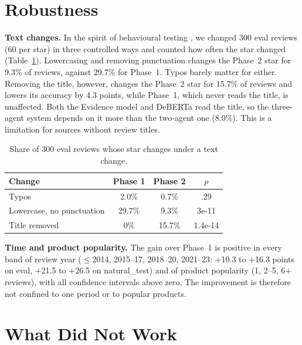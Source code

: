 \documentclass[runningheads]{llncs}
\begin{document}
\section{Robustness}
\label{sec:robust}

\textbf{Text changes.} In the spirit of behavioural testing \cite{ribeiro2020checklist}, we changed 300 eval reviews (60 per star) in three controlled ways and counted how often the star changed (Table~\ref{tbl:robust}). Lowercasing and removing punctuation changes the Phase~2 star for 9.3\% of reviews, against 29.7\% for Phase~1. Typos barely matter for either. Removing the title, however, changes the Phase~2 star for 15.7\% of reviews and lowers its accuracy by 4.3 points, while Phase~1, which never reads the title, is unaffected. Both the Evidence model and DeBERTa read the title, so the three-agent system depends on it more than the two-agent one (8.0\%). This is a limitation for sources without review titles.

\begin{table}[t]
\centering
\caption{Share of 300 eval reviews whose star changes under a text change.}
\label{tbl:robust}
\small
\begin{tabular}{lccc}
\toprule
Change & Phase 1 & Phase 2 & $p$ \\
\midrule
Typos & 2.0\% & 0.7\% & .29 \\
Lowercase, no punctuation & 29.7\% & 9.3\% & 3e-11 \\
Title removed & 0\% & 15.7\% & 1.4e-14 \\
\bottomrule
\end{tabular}
\end{table}

\textbf{Time and product popularity.} The gain over Phase~1 is positive in every band of review year ($\le$2014, 2015--17, 2018--20, 2021--23: +10.3 to +16.3 points on eval, +21.5 to +26.5 on natural\_test) and of product popularity (1, 2--5, 6+ reviews), with all confidence intervals above zero. The improvement is therefore not confined to one period or to popular products.

\section{What Did Not Work}
\label{sec:failed}
\end{document}
